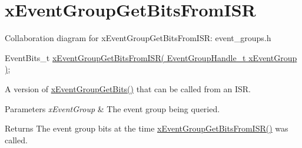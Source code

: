 \hypertarget{group__x_event_group_get_bits_from_i_s_r}{}\section{x\+Event\+Group\+Get\+Bits\+From\+I\+SR}
\label{group__x_event_group_get_bits_from_i_s_r}
Collaboration diagram for x\+Event\+Group\+Get\+Bits\+From\+I\+SR\+:
event\+\_\+groups.\+h 
\begin{DoxyPre}
 EventBits\_t \hyperlink{externals_2freertos_2include_2event__groups_8h_a95822db4357d0b77c35aed0c7427eca0}{xEventGroupGetBitsFromISR( EventGroupHandle\_t xEventGroup )};
\end{DoxyPre}


A version of \hyperlink{externals_2freertos_2include_2event__groups_8h_a0ae86f092fb07ccb475ae938f9a12584}{x\+Event\+Group\+Get\+Bits()} that can be called from an I\+SR.


\begin{DoxyParams}{Parameters}
{\em x\+Event\+Group} & The event group being queried.\\
\hline
\end{DoxyParams}
\begin{DoxyReturn}{Returns}
The event group bits at the time \hyperlink{externals_2freertos_2include_2event__groups_8h_a95822db4357d0b77c35aed0c7427eca0}{x\+Event\+Group\+Get\+Bits\+From\+I\+S\+R()} was called. 
\end{DoxyReturn}
